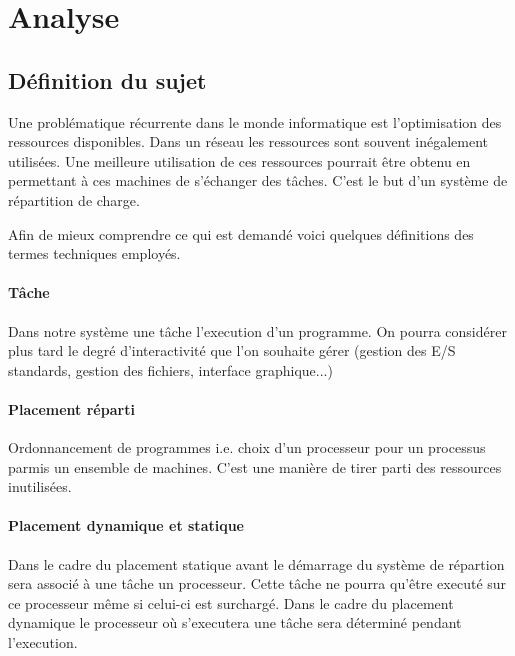 \section{Analyse}
  \subsection{Définition du sujet}
    
    Une problématique récurrente dans le monde informatique est
    l'optimisation des ressources disponibles. Dans un réseau les
    ressources sont souvent inégalement utilisées. Une meilleure
    utilisation de ces ressources pourrait être obtenu en permettant à
    ces machines de s'échanger des tâches. C'est le but d'un système
    de répartition de charge.
        
    Afin de mieux comprendre ce qui est demandé voici quelques
    définitions des termes techniques employés.
    
    \paragraph{Tâche} Dans notre système une tâche l'execution d'un
      programme. On pourra considérer plus tard le degré
      d'interactivité que l'on souhaite gérer (gestion des E/S
      standards, gestion des fichiers, interface graphique...)
      

    \paragraph{Placement réparti} Ordonnancement de programmes i.e. choix
      d'un processeur pour un processus parmis un ensemble de
      machines. C'est une manière de tirer parti des ressources
      inutilisées.
      
    \paragraph{Placement dynamique et statique} Dans le cadre du
      placement statique avant le démarrage du système de répartion sera
      associé à une tâche un processeur. Cette tâche ne pourra
      qu'être executé sur ce processeur même si celui-ci est
      surchargé. Dans le cadre du placement dynamique le processeur où
      s'executera une tâche sera déterminé pendant l'execution.
              
